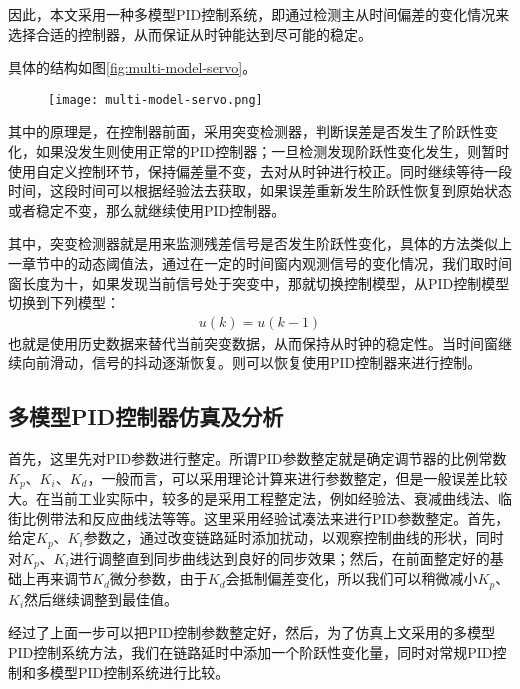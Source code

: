 因此，本文采用一种多模型PID控制系统，即通过检测主从时间偏差的变化情况来选择合适的控制器，从而保证从时钟能达到尽可能的稳定。

具体的结构如图\ref{fig:multi-model-servo}。
\begin{figure}[htbp]
  \centering
  \begin{minipage}[b]{0.7\textwidth}
   \captionstyle{\centering}
   \centering
   \texttt{[image: multi-model-servo.png]}
  \end{minipage}     
\end{figure}

其中的原理是，在控制器前面，采用突变检测器，判断误差是否发生了阶跃性变化，如果没发生则使用正常的PID控制器；一旦检测发现阶跃性变化发生，则暂时使用自定义控制环节，保持偏差量不变，去对从时钟进行校正。同时继续等待一段时间，这段时间可以根据经验法去获取，如果误差重新发生阶跃性恢复到原始状态或者稳定不变，那么就继续使用PID控制器。

其中，突变检测器就是用来监测残差信号是否发生阶跃性变化，具体的方法类似上一章节中的动态阈值法，通过在一定的时间窗内观测信号的变化情况，我们取时间窗长度为十，如果发现当前信号处于突变中，那就切换控制模型，从PID控制模型切换到下列模型：
\begin {align}
u(k) = u(k-1)
\end{align}
也就是使用历史数据来替代当前突变数据，从而保持从时钟的稳定性。当时间窗继续向前滑动，信号的抖动逐渐恢复。则可以恢复使用PID控制器来进行控制。

\subsection{多模型PID控制器仿真及分析}
首先，这里先对PID参数进行整定。所谓PID参数整定就是确定调节器的比例常数$K_{p}$、$K_{i}$、$K_{d}$，一般而言，可以采用理论计算来进行参数整定，但是一般误差比较大。在当前工业实际中，较多的是采用工程整定法，例如经验法、衰减曲线法、临街比例带法和反应曲线法等等。这里采用经验试凑法来进行PID参数整定。首先，给定$K_{p}$、$K_{i}$参数之，通过改变链路延时添加扰动，以观察控制曲线的形状，同时对$K_{p}$、$K_{i}$进行调整直到同步曲线达到良好的同步效果；然后，在前面整定好的基础上再来调节$K_{d}$微分参数，由于$K_{d}$会抵制偏差变化，所以我们可以稍微减小$K_{p}$、$K_{i}$然后继续调整到最佳值。

经过了上面一步可以把PID控制参数整定好，然后，为了仿真上文采用的多模型PID控制系统方法，我们在链路延时中添加一个阶跃性变化量，同时对常规PID控制和多模型PID控制系统进行比较。

